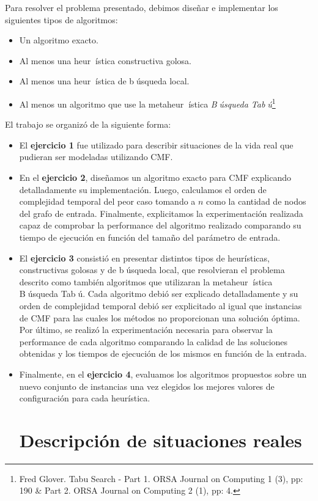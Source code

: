 \documentclass[10pt, a4paper]{article}
\begin{document}
Para resolver el problema presentado, debimos diseñar e implementar los siguientes tipos de algoritmos:

\begin{itemize}
 \item Un algoritmo exacto.
 \item Al menos una heurística constructiva golosa.
 \item Al menos una heurística de búsqueda local.
 \item Al menos un algoritmo que use la metaheurística \textit{Búsqueda Tabú}\footnote{Fred Glover. Tabu Search - Part 1. ORSA Journal on Computing 1 (3), pp: 190 \& Part 2. ORSA Journal on Computing 2 (1), pp: 4.}
\end{itemize}

El trabajo se organizó de la siguiente forma:
\begin{itemize}
\item El \textbf{ejercicio 1} fue utilizado para describir situaciones de la vida real que pudieran ser modeladas utilizando CMF.
\item En el \textbf{ejercicio 2}, diseñamos un algoritmo exacto para CMF explicando detalladamente su implementación. Luego, calculamos el orden de complejidad temporal del peor caso tomando a $n$ como la cantidad de nodos del grafo de entrada. Finalmente, explicitamos la experimentación realizada capaz de comprobar la performance del algoritmo realizado comparando su tiempo de ejecución en función del tamaño del parámetro de entrada.
\item El \textbf{ejercicio 3} consistió en presentar distintos tipos de heurísticas, constructivas golosas y de búsqueda local, que resolvieran el problema descrito como también algoritmos que utilizaran la metaheurística Búsqueda Tabú. Cada algoritmo debió ser explicado detalladamente y su orden de complejidad temporal debió ser explicitado al igual que instancias de CMF para las cuales los métodos no proporcionan una solución óptima. Por último, se realizó la experimentación necesaria para observar la performance de cada algoritmo comparando la calidad de las soluciones obtenidas y los tiempos de ejecución de los mismos en función de la entrada.
\item Finalmente, en el \textbf{ejercicio 4}, evaluamos los algoritmos propuestos sobre un nuevo conjunto de instancias una vez elegidos los mejores valores de configuración para cada heurística.
\newpage

\section{Descripción de situaciones reales}

\newpage


\end{itemize}
\end{document}
